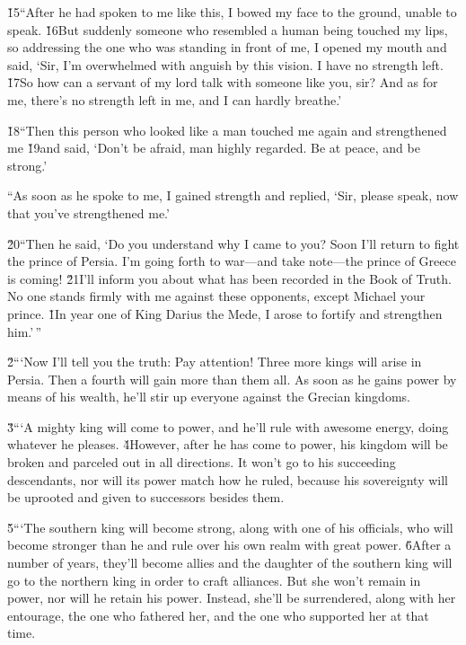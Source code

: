 \v{15}``After he had spoken to me like this, I bowed my face to the ground, unable to speak. \v{16}But suddenly someone who resembled a human being touched my lips, so addressing the one who was standing in front of me, I opened my mouth and said, `Sir, I'm overwhelmed with anguish by this vision. I have no strength left. \v{17}So how can a servant of my lord talk with someone like you, sir? And as for me, there's no strength left in me, and I can hardly breathe.'

\v{18}``Then this person who looked like a man touched me again and strengthened me \v{19}and said, `Don't be afraid, man highly regarded. Be at peace, and be strong.'

``As soon as he spoke to me, I gained strength and replied, `Sir, please speak, now that you've strengthened me.'

\v{20}``Then he said, `Do you understand why I came to you? Soon I'll return to fight the prince of Persia. I'm going forth to war---and take note---the prince of Greece is coming! \v{21}I'll inform you about what has been recorded in the Book of Truth. No one stands firmly with me against these opponents, except Michael your prince.
\v{1}In year one of King Darius the Mede, I arose to fortify and strengthen him.'\,''

\v{2}```Now I'll tell you the truth: Pay attention! Three more kings will arise in Persia. Then a fourth will gain more than them all. As soon as he gains power by means of his wealth, he'll stir up everyone against the Grecian kingdoms.

\v{3}```A mighty king will come to power, and he'll rule with awesome energy, doing whatever he pleases. \v{4}However, after he has come to power, his kingdom will be broken and parceled out in all directions. It won't go to his succeeding descendants, nor will its power match how he ruled, because his sovereignty will be uprooted and given to successors besides them.

\v{5}```The southern king will become strong, along with one of his officials, who will become stronger than he and rule over his own realm with great power. \v{6}After a number of years, they'll become allies and the daughter of the southern king will go to the northern king in order to craft alliances. But she won't remain in power, nor will he retain his power. Instead, she'll be surrendered, along with her entourage, the one who fathered her, and the one who supported her at that time.

